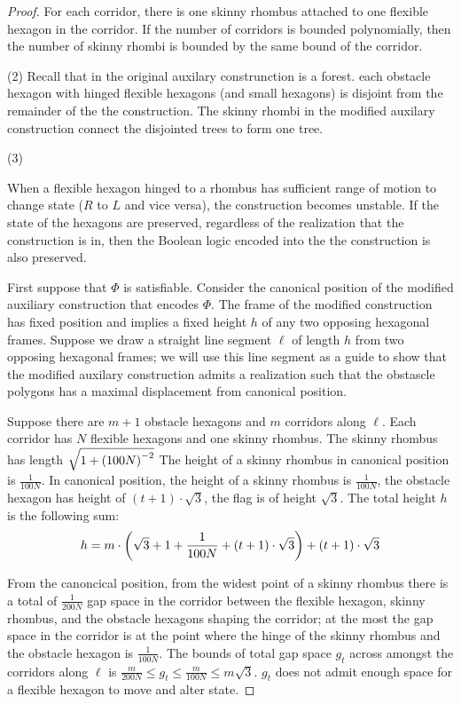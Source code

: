 \begin{proof}
For each corridor, there is one skinny rhombus attached to one flexible hexagon in the corridor.  If the number of corridors is bounded polynomially, then the number of skinny rhombi is bounded by the same bound of the corridor.

\noindent (2) Recall that in the original auxilary construnction is a forest.
each obstacle hexagon with hinged flexible hexagons (and small hexagons) is disjoint from the remainder of the the construction. 
The skinny rhombi in the modified auxilary construction connect the disjointed trees to form one tree.

\noindent (3) 

When a flexible hexagon hinged to a rhombus has sufficient range of motion to change state ($R$ to $L$ and vice versa), the construction becomes unstable.  
If the state of the hexagons are preserved, regardless of the realization that the construction is in, then the Boolean logic encoded into the the construction is also preserved.

 First suppose that $\Phi$ is satisfiable.  
 Consider the canonical position of the modified auxiliary construction that encodes $\Phi$.
 The frame of the modified construction has fixed position and implies a fixed height $h$ of any two opposing hexagonal frames.
Suppose we draw a straight line segment $\ell$ of length $h$ from two opposing hexagonal frames; we will use this line segment as a guide to show that the modified auxilary construction admits a realization such that the obstascle polygons has a maximal displacement from canonical position.

Suppose there are $m+1$ obstacle hexagons and $m$ corridors along $\ell$.
Each corridor has $N$ flexible hexagons and one skinny rhombus. 
The skinny rhombus  has length $\sqrt{1 + \left( 100N \right)^{-2}}$
The height of a skinny rhombus in canonical position is $\frac{1}{100N}$.
In canonical position, the height of a skinny rhombus is $\frac{1}{100N}$, the obstacle hexagon has height of $ (t+1) \cdot \sqrt{3}$, the flag is of height $\sqrt{3}$.  
The total height $h$ is the following sum:
$$h = m \cdot \left( \sqrt{3} + 1 + \frac{1}{100N} + (t+1) \cdot \sqrt{3} \right) + (t+1) \cdot \sqrt{3}$$

From the canoncical position, from the widest point of a skinny rhombus there is a total of $\frac{1}{200N}$ gap space in the corridor between the flexible hexagon, skinny rhombus, and the obstacle hexagons shaping the corridor; at the most the gap space in the corridor is at the point where the hinge of the skinny rhombus and the obstacle hexagon is $\frac{1}{100N}$.
The bounds of total gap space $g_t$ across amongst the corridors along $\ell$ is $\frac{m}{200N} \leq g_t \leq \frac{m}{100N} \leq m \sqrt{3}$.
$g_t$ does not admit enough space for a flexible hexagon to move and alter state.



\end{proof}
